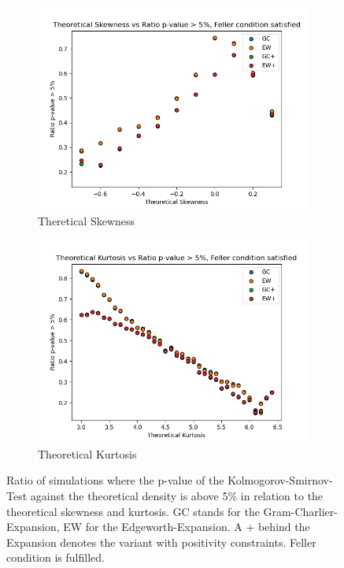 \begin{figure}
    \centering
    \begin{subfigure}[b]{0.4\textwidth}
        \centering
        \includegraphics[width=\textwidth]{img/theoretical_skewness_vs_ratio_gc_ew_feller_condition_true.png}
        \caption{Theretical Skewness}
    \end{subfigure}
    \hfill
    \begin{subfigure}[b]{0.4\textwidth}
        \centering
        \includegraphics[width=\textwidth]{img/theoretical_kurtosis_vs_ratio_gc_ew_feller_condition_true.png}
        \caption{Theoretical Kurtosis}
    \end{subfigure}
    \caption{Ratio of simulations where the p-value of the Kolmogorov-Smirnov-Test against the theoretical density is above 5\% in relation to the theoretical skewness and kurtosis. GC stands for the Gram-Charlier-Expansion, EW for the Edgeworth-Expansion. A + behind the Expansion denotes the variant with positivity constraints. Feller condition is fulfilled.}
    \label{fig:gc_vs_ew_theoretical_skewness_kurtosis}
\end{figure}


